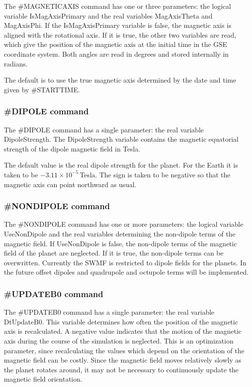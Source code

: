 The \#MAGNETICAXIS command has one or three parameters: the logical variable
IsMagAxisPrimary and the real variables MagAxisTheta and MagAxisPhi.
If the IsMagAxisPrimary variable is false, the magnetic axis
is aligned with the rotational axis. If it is true, the other two variables
are read, which give the position of the magnetic axis at the
initial time in the GSE coordinate system. Both angles are read in degrees
and stored internally in radians.

The default is to use the true magnetic axis determined by the 
date and time given by \#STARTTIME.

\subsubsection{\#DIPOLE command}

The \#DIPOLE command has a single parameter: the real variable
DipoleStrength. The DipoleStrength variable contains the 
magnetic equatorial strength of the dipole magnetic field in Tesla.

The default value is the real dipole strength for the planet.
For the Earth it is taken to be $-3.11\times 10^{-5}\,$Tesla.
The sign is taken to be negative so that the magnetic axis can 
point northward as usual.

\subsubsection{\#NONDIPOLE command}

The \#NONDIPOLE command has one or more parameters: the logical
variable UseNonDipole and the real variables determining the
non-dipole terms of the magnetic field. If UseNonDipole is false,
the non-dipole terms of the magnetic field of the planet are neglected.
If it is true, the non-dipole terms can be overwritten. Currently
the SWMF is restricted to dipole fields for the planets.
In the future offset dipoles and quadrupole and octupole terms
will be implemented.

\subsubsection{\#UPDATEB0 command}

The \#UPDATEB0 command has a single parameter: the real variable
DtUpdateB0. This variable determines how often the position of
the magnetic axis is recalculated. A negative value indicates that
the motion of the magnetic axis during the course of the simulation
is neglected. This is an optimization parameter, since recalculating
the values which depend on the orientation of the magnetic
field can be costly. Since the magnetic field moves relatively
slowly as the planet rotates around, it may not be necessary
to continuously update the magnetic field orientation.

